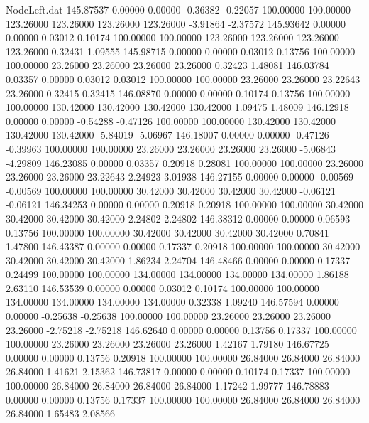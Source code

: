 \begin{filecontents}{NodeLeft.dat}
 145.87537    0.00000    0.00000    -0.36382   -0.22057  100.00000  100.00000  123.26000  123.26000  123.26000  123.26000   -3.91864   -2.37572
 145.93642    0.00000    0.00000     0.03012    0.10174  100.00000  100.00000  123.26000  123.26000  123.26000  123.26000    0.32431    1.09555
 145.98715    0.00000    0.00000     0.03012    0.13756  100.00000  100.00000   23.26000   23.26000   23.26000   23.26000    0.32423    1.48081
 146.03784    0.03357    0.00000     0.03012    0.03012  100.00000  100.00000   23.26000   23.26000   23.22643   23.26000    0.32415    0.32415
 146.08870    0.00000    0.00000     0.10174    0.13756  100.00000  100.00000  130.42000  130.42000  130.42000  130.42000    1.09475    1.48009
 146.12918    0.00000    0.00000    -0.54288   -0.47126  100.00000  100.00000  130.42000  130.42000  130.42000  130.42000   -5.84019   -5.06967
 146.18007    0.00000    0.00000    -0.47126   -0.39963  100.00000  100.00000   23.26000   23.26000   23.26000   23.26000   -5.06843   -4.29809
 146.23085    0.00000    0.03357     0.20918    0.28081  100.00000  100.00000   23.26000   23.26000   23.26000   23.22643    2.24923    3.01938
 146.27155    0.00000    0.00000    -0.00569   -0.00569  100.00000  100.00000   30.42000   30.42000   30.42000   30.42000   -0.06121   -0.06121
 146.34253    0.00000    0.00000     0.20918    0.20918  100.00000  100.00000   30.42000   30.42000   30.42000   30.42000    2.24802    2.24802
 146.38312    0.00000    0.00000     0.06593    0.13756  100.00000  100.00000   30.42000   30.42000   30.42000   30.42000    0.70841    1.47800
 146.43387    0.00000    0.00000     0.17337    0.20918  100.00000  100.00000   30.42000   30.42000   30.42000   30.42000    1.86234    2.24704
 146.48466    0.00000    0.00000     0.17337    0.24499  100.00000  100.00000  134.00000  134.00000  134.00000  134.00000    1.86188    2.63110
 146.53539    0.00000    0.00000     0.03012    0.10174  100.00000  100.00000  134.00000  134.00000  134.00000  134.00000    0.32338    1.09240
 146.57594    0.00000    0.00000    -0.25638   -0.25638  100.00000  100.00000   23.26000   23.26000   23.26000   23.26000   -2.75218   -2.75218
 146.62640    0.00000    0.00000     0.13756    0.17337  100.00000  100.00000   23.26000   23.26000   23.26000   23.26000    1.42167    1.79180
 146.67725    0.00000    0.00000     0.13756    0.20918  100.00000  100.00000   26.84000   26.84000   26.84000   26.84000    1.41621    2.15362
 146.73817    0.00000    0.00000     0.10174    0.17337  100.00000  100.00000   26.84000   26.84000   26.84000   26.84000    1.17242    1.99777
 146.78883    0.00000    0.00000     0.13756    0.17337  100.00000  100.00000   26.84000   26.84000   26.84000   26.84000    1.65483    2.08566

\end{filecontents}
